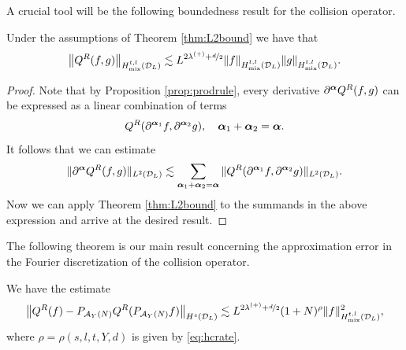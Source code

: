 A crucial tool will be the following boundedness result for the
collision operator.
\begin{theorem}\label{thm:CollSmooth}
    Under the assumptions of Theorem \ref{thm:L2bound} we have that
    \begin{equation}
        \left\|Q^R(f,g)\right\|_{{H}_{\mathrm{mix}}^{t,l}(\mathcal{D}_L)}
            \lesssim 
                L^{2\lambda^{(+)}+\nicefrac{d}{2}}
                \|f\|_{{H}_{\mathrm{mix}}^{t,l}(\mathcal{D}_L)}
                \|g\|_{{H}_{\mathrm{mix}}^{t,l}(\mathcal{D}_L)}.
    \end{equation}
\end{theorem}
\begin{proof}
    Note that by Proposition \ref{prop:prodrule}, every derivative
    $\partial^{\bm\alpha} Q^R(f,g)$ can be expressed as a linear combination of
    terms 
    \[
        Q^R(\partial^{{\bm\alpha}_1}f,\partial^{{\bm\alpha}_2}g), \quad {\bm\alpha}_1 +
                {\bm\alpha}_2 = {\bm\alpha}.
    \]
    It follows that we can estimate
    \[
        \|\partial^{\bm\alpha} Q^R(f,g)\|_{L^2(\mathcal{D}_L)} \lesssim 
                \sum_{{\bm\alpha}_1 + {\bm\alpha}_2 = {\bm\alpha}}
                \|Q^R(\partial^{{\bm\alpha}_1}f,\partial^{{\bm\alpha}_2}g)\|_{L^2(\mathcal{D}_L)}.
    \]
    Now we can apply Theorem \ref{thm:L2bound} to the summands in the above
    expression and arrive at the desired result.
\end{proof}
The following theorem is our main result concerning the approximation error in
the Fourier discretization of the collision operator.
\begin{theorem}\label{thm:mainapprox}
    We have the estimate 
    \begin{multline*}
        \left\|Q^R(f) - P_{\mathcal{A}_Y(N)} Q^R(P_{\mathcal{A}_Y(N)}f)\right\|_{H^s(\mathcal{D}_L)} \lesssim
            L^{2\lambda^{(+)}+\nicefrac{d}{2}}
            (1+N)^\rho \|f\|_{{H}_{\mathrm{mix}}^{t,l} (\mathcal{D}_L)}^2 ,
    \end{multline*}
    where $\rho=\rho(s,l,t,Y,d)$ is given by \eqref{eq:hcrate}.
\end{theorem}
